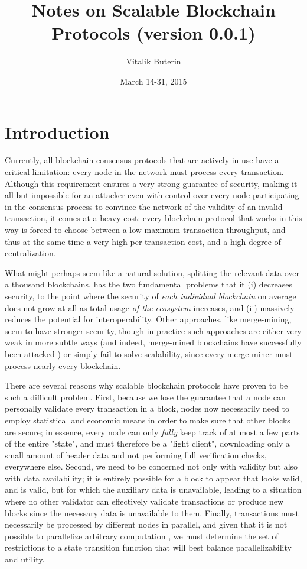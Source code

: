 \documentclass[11pt,a4paper]{report}
\title{Notes on Scalable Blockchain Protocols (version 0.0.1)}
\date{March 14-31, 2015}
\author{Vitalik Buterin}
\theoremstyle{plain}
\theoremstyle{definition}
\theoremstyle{remark}
\begin{document}
\maketitle


\chapter{Introduction}

Currently, all blockchain consensus protocols that are actively in use have a critical limitation: every node in the network must process every transaction. Although this requirement ensures a very strong guarantee of security, making it all but impossible for an attacker even with control over every node participating in the consensus process to convince the network of the validity of an invalid transaction, it comes at a heavy cost: every blockchain protocol that works in this way is forced to choose between a low maximum transaction throughput, and thus at the same time a very high per-transaction cost, and a high degree of centralization.

What might perhaps seem like a natural solution, splitting the relevant data over a thousand blockchains, has the two fundamental problems that it (i) decreases security, to the point where the security of \emph{each individual blockchain} on average does not grow at all as total usage \emph{of the ecosystem} increases, and (ii) massively reduces the potential for interoperability. Other approaches, like merge-mining, seem to have stronger security, though in practice such approaches are either very weak in more subtle ways \cite{mmpetertodd} (and indeed, merge-mined blockchains have successfully been attacked \cite{coiledcoin}) or simply fail to solve scalability, since every merge-miner must process nearly every blockchain.

There are several reasons why scalable blockchain protocols have proven to be such a difficult problem. First, because we lose the guarantee that a node can personally validate every transaction in a block, nodes now necessarily need to employ statistical and economic means in order to make sure that other blocks are secure; in essence, every node can only \emph{fully} keep track of at most a few parts of the entire "state", and must therefore be a "light client", downloading only a small amount of header data and not performing full verification checks, everywhere else. Second, we need to be concerned not only with validity but also with data availability; it is entirely possible for a block to appear that looks valid, and is valid, but for which the auxiliary data is unavailable, leading to a situation where no other validator can effectively validate transactions or produce new blocks since the necessary data is unavailable to them. Finally, transactions must necessarily be processed by different nodes in parallel, and given that it is not possible to parallelize arbitrary computation \cite{parallelcomputing}, we must determine the set of restrictions to a state transition function that will best balance parallelizability and utility.
\end{document}
